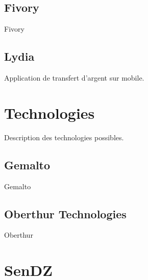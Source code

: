 \documentclass{report}
\begin{document}
\section{Fivory}
Fivory
\section{Lydia}
Application de transfert d'argent sur mobile.

\chapter{Technologies}
Description des technologies possibles.
\section{Gemalto}
Gemalto
\section{Oberthur Technologies}
Oberthur
\chapter{SenDZ}
\end{document}
